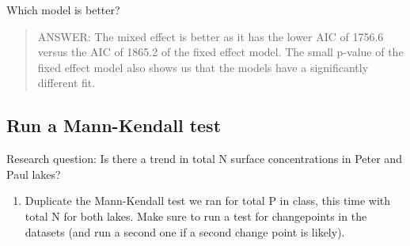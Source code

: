 \documentclass[]{article}
\newenvironment{Shaded}{\begin{snugshade}}{\end{snugshade}}
\newcommand{\KeywordTok}[1]{\textcolor[rgb]{0.13,0.29,0.53}{\textbf{#1}}}
\newcommand{\DataTypeTok}[1]{\textcolor[rgb]{0.13,0.29,0.53}{#1}}
\newcommand{\DecValTok}[1]{\textcolor[rgb]{0.00,0.00,0.81}{#1}}
\newcommand{\StringTok}[1]{\textcolor[rgb]{0.31,0.60,0.02}{#1}}
\newcommand{\CommentTok}[1]{\textcolor[rgb]{0.56,0.35,0.01}{\textit{#1}}}
\newcommand{\OperatorTok}[1]{\textcolor[rgb]{0.81,0.36,0.00}{\textbf{#1}}}
\newcommand{\NormalTok}[1]{#1}
\providecommand{\tightlist}{%
  \setlength{\itemsep}{0pt}\setlength{\parskip}{0pt}}
\begin{document}
Which model is better?

\begin{quote}
ANSWER: The mixed effect is better as it has the lower AIC of 1756.6
versus the AIC of 1865.2 of the fixed effect model. The small p-value of
the fixed effect model also shows us that the models have a
significantly different fit.
\end{quote}

\subsection{Run a Mann-Kendall test}\label{run-a-mann-kendall-test}

Research question: Is there a trend in total N surface concentrations in
Peter and Paul lakes?

\begin{enumerate}
\def\labelenumi{\arabic{enumi}.}
\setcounter{enumi}{3}
\tightlist
\item
  Duplicate the Mann-Kendall test we ran for total P in class, this time
  with total N for both lakes. Make sure to run a test for changepoints
  in the datasets (and run a second one if a second change point is
  likely).
\end{enumerate}

\begin{Shaded}
\end{Shaded}
\end{document}
